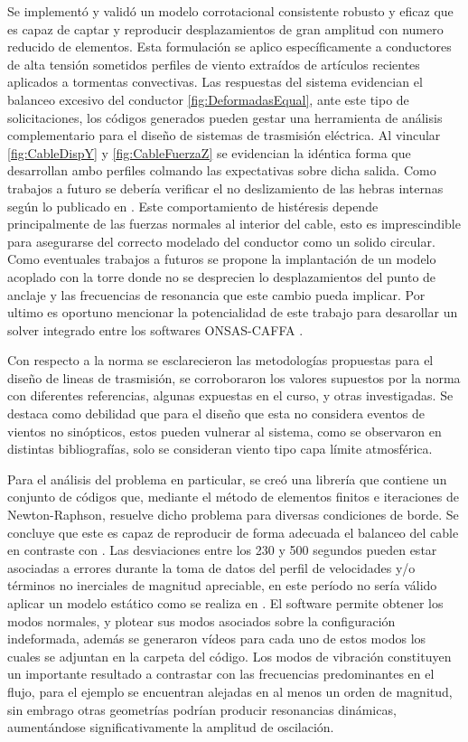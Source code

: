 Se implementó y validó un modelo corrotacional consistente robusto y eficaz que es capaz de captar y reproducir desplazamientos de gran amplitud con numero reducido de elementos.  Esta formulación se aplico específicamente a conductores de alta tensión sometidos perfiles de viento extraídos de artículos recientes aplicados a tormentas convectivas. Las respuestas del sistema evidencian el balanceo excesivo del conductor \ref{fig:DeformadasEqual}, ante este tipo de solicitaciones, los códigos generados pueden gestar una herramienta de análisis complementario para el diseño de sistemas de trasmisión eléctrica. Al vincular 		\ref{fig:CableDispY} y \ref{fig:CableFuerzaZ} se evidencian la idéntica forma que desarrollan ambo perfiles colmando las expectativas sobre dicha salida. Como trabajos a futuro se debería verificar el no deslizamiento de las hebras internas según lo publicado en \citet{foti2018finite}. Este comportamiento de histéresis depende principalmente de las fuerzas normales al interior del cable, esto es imprescindible para asegurarse del correcto modelado del conductor como un solido circular. Como eventuales trabajos a futuros se propone la implantación de un modelo acoplado con la torre donde no se desprecien lo desplazamientos del punto de anclaje y las frecuencias de resonancia que este cambio pueda implicar. Por ultimo es oportuno mencionar la potencialidad de este trabajo para desarollar un solver integrado entre los softwares ONSAS-CAFFA \cite{usera2008parallel}.




Con respecto a la norma se esclarecieron las metodologías propuestas para el diseño de lineas de trasmisión,  se corroboraron los valores supuestos por la norma con diferentes referencias, algunas expuestas en el curso, y otras investigadas. Se destaca como debilidad que para el diseño que esta no considera eventos de vientos no sinópticos, estos pueden vulnerar al sistema, como se observaron en distintas bibliografías, solo se consideran viento tipo capa límite atmosférica. 


Para el análisis del  problema en particular, se creó una librería que contiene un conjunto de códigos que, mediante el método de elementos finitos e iteraciones de Newton-Raphson, resuelve dicho problema para diversas condiciones de borde.  Se concluye que este es capaz de reproducir de forma adecuada el balanceo del cable en contraste con \cite{Stengel2017}. Las desviaciones entre los 230 y 500 segundos pueden estar asociadas a errores durante la toma de datos del perfil de velocidades y/o términos no inerciales de magnitud apreciable, en este período no sería válido aplicar un modelo estático como se realiza en \cite{Stengel2017}. El software permite obtener los modos normales, y plotear sus modos asociados sobre la configuración indeformada, además se generaron vídeos para cada uno de estos modos los cuales se adjuntan en la carpeta del código. Los modos de vibración constituyen un importante resultado a contrastar con las frecuencias predominantes en el flujo, para el ejemplo se encuentran alejadas en al menos un orden de magnitud, sin embrago otras geometrías podrían producir resonancias dinámicas, aumentándose significativamente la amplitud de oscilación. 

